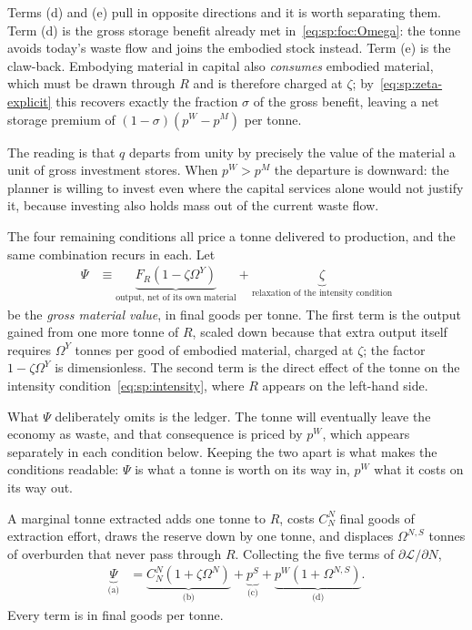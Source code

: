 Terms (d) and (e) pull in opposite directions and it is worth separating them. Term (d) is the gross storage benefit already met in~\eqref{eq:sp:foc:Omega}: the tonne avoids today's waste flow and joins the embodied stock instead. Term (e) is the claw-back. Embodying material in capital also \emph{consumes} embodied material, which must be drawn through $R$ and is therefore charged at $\zeta$; by~\eqref{eq:sp:zeta-explicit} this recovers exactly the fraction $\sigma$ of the gross benefit, leaving a net storage premium of $\left(1-\sigma\right)\left(p^W-p^M\right)$ per tonne.

The reading is that $q$ departs from unity by precisely the value of the material a unit of gross investment stores. When $p^W>p^M$ the departure is downward: the planner is willing to invest even where the capital services alone would not justify it, because investing also holds mass out of the current waste flow.

 The four remaining conditions all price a tonne delivered to production, and the same combination recurs in each. Let
\begin{align}
\Psi &\equiv \underbrace{F_R\left(1-\zeta\Omega^Y\right)}_{\text{output, net of its own material}}+\underbrace{\zeta}_{\text{relaxation of the intensity condition}}
\label{eq:sp:Psi}
\end{align}
be the \emph{gross material value}, in final goods per tonne. The first term is the output gained from one more tonne of $R$, scaled down because that extra output itself requires $\Omega^Y$ tonnes per good of embodied material, charged at $\zeta$; the factor $1-\zeta\Omega^Y$ is dimensionless. The second term is the direct effect of the tonne on the intensity condition~\eqref{eq:sp:intensity}, where $R$ appears on the left-hand side.

What $\Psi$ deliberately omits is the ledger. The tonne will eventually leave the economy as waste, and that consequence is priced by $p^W$, which appears separately in each condition below. Keeping the two apart is what makes the conditions readable: $\Psi$ is what a tonne is worth on its way in, $p^W$ what it costs on its way out.

 A marginal tonne extracted adds one tonne to $R$, costs $C^N_N$ final goods of extraction effort, draws the reserve down by one tonne, and displaces $\Omega^{N,S}$ tonnes of overburden that never pass through $R$. Collecting the five terms of $\partial\mathcal L/\partial N$,
\begin{align}
\underbrace{\Psi}_{\text{(a)}} &= \underbrace{C^N_N\left(1+\zeta\Omega^N\right)}_{\text{(b)}}
+\underbrace{p^S}_{\text{(c)}}
+\underbrace{p^W\left(1+\Omega^{N,S}\right)}_{\text{(d)}} .
\label{eq:sp:foc:N}
\end{align}
Every term is in final goods per tonne.

